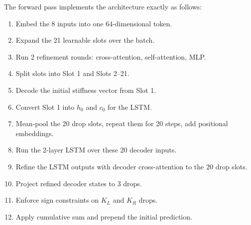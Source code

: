 \documentclass[11pt,a4paper]{article}
\begin{document}
The forward pass implements the architecture exactly as follows:

\begin{enumerate}[nosep]
    \item Embed the 8 inputs into one 64-dimensional token.
    \item Expand the 21 learnable slots over the batch.
    \item Run 2 refinement rounds: cross-attention, self-attention, MLP.
    \item Split slots into Slot 1 and Slots 2--21.
    \item Decode the initial stiffness vector from Slot 1.
    \item Convert Slot 1 into $h_0$ and $c_0$ for the LSTM.
    \item Mean-pool the 20 drop slots, repeat them for 20 steps, add positional embeddings.
    \item Run the 2-layer LSTM over these 20 decoder inputs.
    \item Refine the LSTM outputs with decoder cross-attention to the 20 drop slots.
    \item Project refined decoder states to 3 drops.
    \item Enforce sign constraints on $K_L$ and $K_R$ drops.
    \item Apply cumulative sum and prepend the initial prediction.
\end{enumerate}
\end{document}
